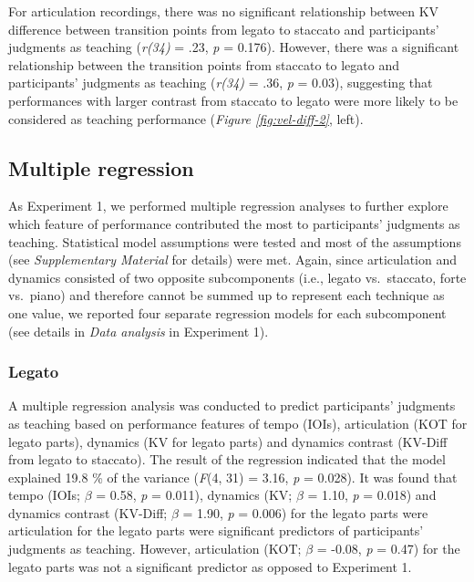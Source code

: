 \documentclass[
  man,floatsintext]{apa6}
\begin{document}
For articulation recordings, there was no significant relationship between KV difference between transition points from legato to staccato and participants' judgments as teaching (\emph{r(34)} = .23, \emph{p} = 0.176). However, there was a significant relationship between the transition points from staccato to legato and participants' judgments as teaching (\emph{r(34)} = .36, \emph{p} = 0.03), suggesting that performances with larger contrast from staccato to legato were more likely to be considered as teaching performance (\emph{Figure \ref{fig:vel-diff-2}}, left).

\hypertarget{multiple-regression-1}{%
\subsection{Multiple regression}\label{multiple-regression-1}}

As Experiment 1, we performed multiple regression analyses to further explore which feature of performance contributed the most to participants' judgments as teaching. Statistical model assumptions were tested and most of the assumptions (see \emph{Supplementary Material} for details) were met. Again, since articulation and dynamics consisted of two opposite subcomponents (i.e., legato vs.~staccato, forte vs.~piano) and therefore cannot be summed up to represent each technique as one value, we reported four separate regression models for each subcomponent (see details in \emph{Data analysis} in Experiment 1).

\hypertarget{legato-1}{%
\subsubsection{Legato}\label{legato-1}}

A multiple regression analysis was conducted to predict participants' judgments as teaching based on performance features of tempo (IOIs), articulation (KOT for legato parts), dynamics (KV for legato parts) and dynamics contrast (KV-Diff from legato to staccato). The result of the regression indicated that the model explained 19.8 \% of the variance (\emph{F}(4, 31) = 3.16, \emph{p} = 0.028). It was found that tempo (IOIs; \emph{\(\beta\)} = 0.58, \emph{p} = 0.011), dynamics (KV; \emph{\(\beta\)} = 1.10, \emph{p} = 0.018) and dynamics contrast (KV-Diff; \emph{\(\beta\)} = 1.90, \emph{p} = 0.006) for the legato parts were articulation for the legato parts were significant predictors of participants' judgments as teaching. However, articulation (KOT; \emph{\(\beta\)} = -0.08, \emph{p} = 0.47) for the legato parts was not a significant predictor as opposed to Experiment 1.
\end{document}
